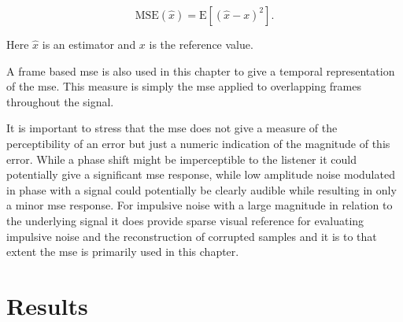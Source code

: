 \begin{equation}\label{eq:MSEdef}
\textrm{MSE}\left(\hat{x}\right) = \textrm{E} \left[ \left( \hat{x} - x \right)^2\right].
\end{equation}

Here $\hat{x}$ is an estimator and $x$ is the reference value.

A frame based \DIFdelbegin {}\DIFdelend \DIFaddbegin \gls{mse} \DIFaddend is also used in this chapter to give a temporal representation of the \DIFdelbegin {}\DIFdelend \DIFaddbegin \gls{mse}\DIFaddend . This measure is simply the \DIFdelbegin {}\DIFdelend \DIFaddbegin \gls{mse} \DIFaddend applied to overlapping frames throughout the signal.

It is important to stress that the \DIFdelbegin {}\DIFdelend \DIFaddbegin \gls{mse} \DIFaddend does not give a measure of the perceptibility of an error but just a numeric indication of the magnitude of this error. While a phase shift might be imperceptible to the listener it could potentially give a significant \DIFdelbegin {}\DIFdelend \DIFaddbegin \gls{mse} \DIFaddend response, while low amplitude noise modulated in phase with a signal could potentially be clearly audible while resulting in only a minor \DIFdelbegin {}\DIFdelend \DIFaddbegin \gls{mse} \DIFaddend response. For impulsive noise with a large magnitude in relation to the underlying signal it does provide sparse visual reference for evaluating impulsive noise and the reconstruction of corrupted samples and it is to that extent the \DIFdelbegin {}\DIFdelend \DIFaddbegin \gls{mse} \DIFaddend is primarily used in this chapter.

%


\section{Results}\label{sec:RestorationResults}
